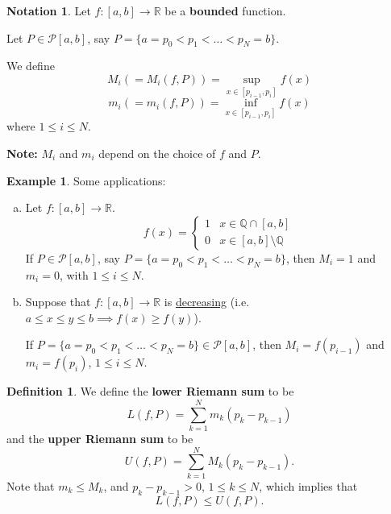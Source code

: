 \documentclass[11pt]{article}
\theoremstyle{definition}
\newtheorem{defn}[thm]{Definition}
\newtheorem{exmp}[thm]{Example}
\newtheorem{notation}[thm]{Notation}
\newcommand{\mbQ}{\ensuremath{\mathbb{Q}}}
\newcommand{\mbR}{\ensuremath{\mathbb{R}}}
\begin{document}
\begin{notation}
Let $f : [a, b] \to \mbR$ be a \textbf{bounded} function. 

Let $P \in \mathcal{P}[a, b]$, say $P = \{a = p_0 < p_1 < \dots < p_N = b\}$. 

We define
$$ M_i (= M_i (f, P)) = \sup_{x \in [p_{i-1}, p_i]} f(x) $$
$$ m_i (= m_i (f, P)) = \inf_{x \in [p_{i-1}, p_i]} f(x) $$
where $1 \leq i \leq N$. 

\textbf{Note:} $M_i$ and $m_i$ depend on the choice of $f$ and $P$.
\end{notation}

\begin{exmp} 
Some applications: \vspace{-0.2cm}
\begin{enumerate}[(a)]

\item Let $f : [a, b] \to \mbR$. 
$$ f(x) = \begin{cases}
			1 & x \in \mbQ \cap [a, b] \\
			0 & x \in [a, b] \setminus \mbQ
		 \end{cases} $$
If $P \in \mathcal{P}[a, b]$, say $P = \{a = p_0 < p_1 < \hdots < p_N = b\}$, then $M_i = 1$ and $m_i = 0$, with $1 \leq i \leq N$.

\item Suppose that $f : [a, b] \to \mbR$ is \underline{decreasing} (i.e. $a \leq x \leq y \leq b \implies f(x) \geq f(y)$). 

If $P = \{a = p_0 < p_1 < \hdots < p_N = b\} \in \mathcal{P}[a, b]$, then $M_i = f(p_{i-1})$ and $m_i = f(p_i)$, $1 \leq i \leq N$.

\end{enumerate}
\end{exmp}

\begin{defn}
We define the \textbf{lower Riemann sum} to be
$$L(f, P) = \sum_{k=1}^N m_k (p_k - p_{k-1}) $$
and the \textbf{upper Riemann sum} to be
$$U(f, P) = \sum_{k=1}^N M_k (p_k - p_{k-1}) \text{.}$$
Note that $m_k \leq M_k$, and $p_k - p_{k-1} > 0$, $1 \leq k \leq N$, which implies that
$$L(f, P) \leq U(f, P) \text{.}$$
\end{defn}
\end{document}
